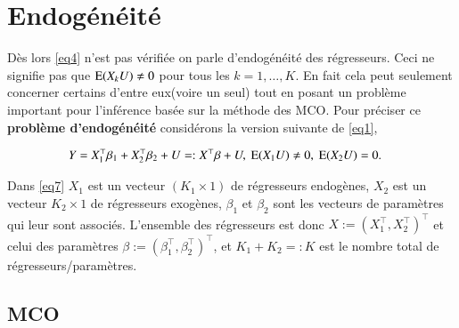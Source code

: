 \documentclass[10pt, reqno]{amsart}
\begin{document}
\section{Endogénéité}

Dès lors \eqref{eq4} n'est pas vérifiée on parle d'endogénéité des régresseurs. Ceci ne signifie pas que 
 $\operatorname{E}(X_k U) \neq 0 $ pour tous les $k = 1, \ldots, K$. En fait cela peut seulement concerner certains d'entre 
 eux(voire un seul) tout en posant un problème important pour l'inférence basée sur la méthode des MCO. 
 Pour préciser ce \textbf{problème d'endogénéité} considérons la version suivante de 
 \eqref{eq1},

 \begin{align}
	Y &= X_1^\top\beta_1 + X_2^\top\beta_2 + U =: X^\top\beta + U, \ \Exp(X_1U) \neq 0, \ \Exp(X_2U) = 0.
	\label{eq7}
\end{align}

Dans \eqref{eq7} $X_1$ est un vecteur $(K_1\times 1)$ de régresseurs endogènes, $X_2$ est un vecteur $K_2\times 1$  
de régresseurs exogènes, $\beta_1$ et $\beta_2$ sont les vecteurs de paramètres qui leur sont associés. L'ensemble des régresseurs est 
 donc $X := (X_1^\top, X_2^\top) ^\top$ et celui des paramètres $\beta := (\beta_1^\top, \beta_2^\top) ^\top$, et 
 $K_1 + K_2 =: K$ est le nombre total de régresseurs/paramètres.

 \subsection{MCO}
\end{document}
